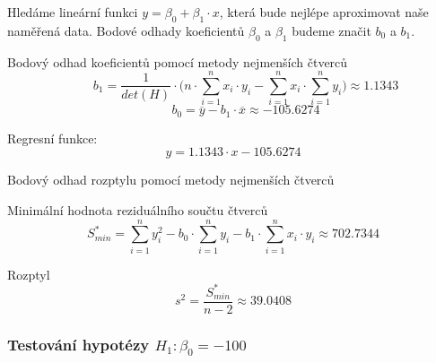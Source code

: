 \begin{compactitem}
    \item Hledáme lineární funkci ${\displaystyle y = \beta_0 + \beta_1 \cdot x}$, která bude nejlépe aproximovat naše naměřená data. Bodové odhady koeficientů ${\displaystyle \beta_0}$ a ${\displaystyle \beta_1}$ budeme značit ${\displaystyle b_0}$ a ${\displaystyle b_1}$.

    \item Bodový odhad koeficientů pomocí metody nejmenších čtverců
    $${\displaystyle \qquad b_1 = \frac{1} {det(H)} \cdot \Bigg( n \cdot \sum_{i=1}^n x_i \cdot y_i - \sum_{i=1}^n x_i \cdot \sum_{i=1}^n y_i \Bigg) \approx 1.1343 }$$
    $${\displaystyle \qquad b_0 = \overline{y} - b_1 \cdot \overline{x} \approx -105.6274}$$ \begin{compactitem}
        \item Regresní funkce: $${\displaystyle y = 1.1343 \cdot x - 105.6274}$$
    \end{compactitem}

    \item Bodový odhad rozptylu pomocí metody nejmenších čtverců \begin{compactitem}
        \item Minimální hodnota reziduálního součtu čtverců
        $${\displaystyle S^*_{min} = \sum_{i=1}^n y_i^2 - b_0 \cdot \sum_{i=1}^n y_i - b_1 \cdot \sum_{i=1}^n x_i \cdot y_i \approx 702.7344}$$

        \item Rozptyl
        $${\displaystyle s^2 = \frac{S^*_{min}} {n-2} \approx 39.0408}$$

    \end{compactitem}
\end{compactitem}

\subsubsection*{Testování hypotézy ${\displaystyle H_1 : \beta_0 = -100}$}

